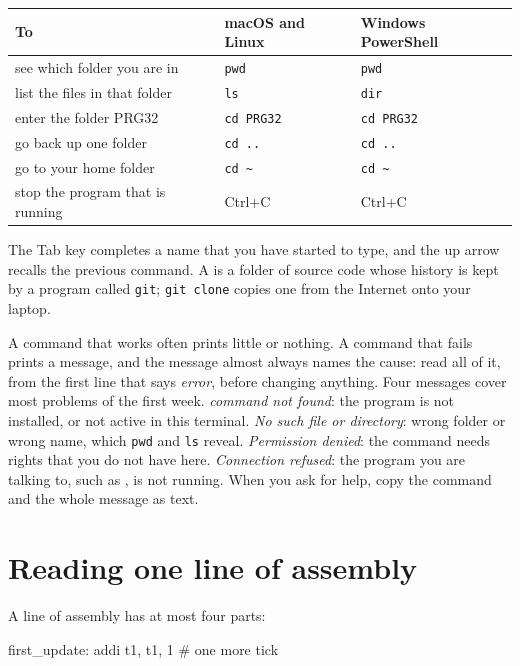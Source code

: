 \begin{center}\small
\begin{tabular}{lll}
\toprule
\textbf{To} & \textbf{macOS and Linux} & \textbf{Windows PowerShell}\\
\midrule
see which folder you are in & \texttt{pwd} & \texttt{pwd}\\
list the files in that folder & \texttt{ls} & \texttt{dir}\\
enter the folder PRG32 & \texttt{cd PRG32} & \texttt{cd PRG32}\\
go back up one folder & \texttt{cd ..} & \texttt{cd ..}\\
go to your home folder & \texttt{cd \textasciitilde} & \texttt{cd \textasciitilde}\\
stop the program that is running & Ctrl+C & Ctrl+C\\
\bottomrule
\end{tabular}
\end{center}

\noindent The Tab key completes a name that you have started to type, and the
up arrow recalls the previous command. A  is a folder of
source code whose history is kept by a program called \texttt{git};
\texttt{git clone} copies one from the Internet onto your laptop.

A command that works often prints little or nothing. A command that fails
prints a message, and the message almost always names the cause: read all of
it, from the first line that says \emph{error}, before changing anything.
Four messages cover most problems of the first week. \emph{command not found}:
the program is not installed, or not active in this terminal. \emph{No such file
or directory}: wrong folder or wrong name, which \texttt{pwd} and \texttt{ls}
reveal. \emph{Permission denied}: the command needs rights that you do not
have here. \emph{Connection refused}: the program you are talking to, such as
\prgqt, is not running. When you ask for help, copy the command and the whole
message as text.

\section*{Reading one line of assembly}

A line of assembly has at most four parts:

\begin{asm}
first_update:   addi t1, t1, 1      # one more tick
\end{asm}

